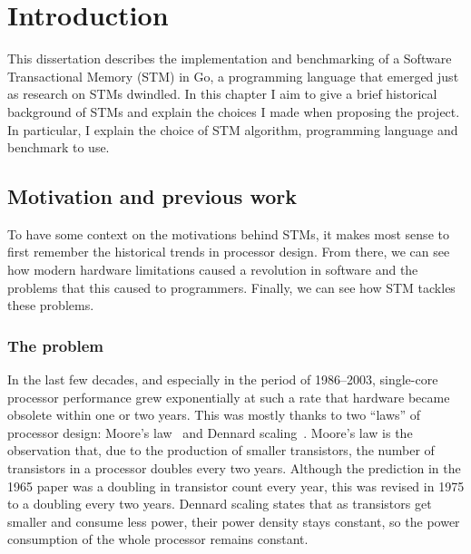 \documentclass[12pt,a4paper,oneside,openright]{report}
\begin{document}
\newpage

\begingroup \let\clearpage\relax \listoffigures{}
 \endgroup


\newpage



\pagestyle{headings}


\chapter{Introduction}


This dissertation describes the implementation and benchmarking of a
Software Transactional Memory (STM) in Go, a programming language that
emerged just as research on STMs dwindled. In this chapter I aim to
give a brief historical background of STMs and explain the choices I
made when proposing the project. In particular, I explain the choice
of STM algorithm, programming language and benchmark to use.

\section{Motivation and previous work}
\label{sec:motivation}

To have some context on the motivations behind STMs, it makes most
sense to first remember the historical trends in processor
design. From there, we can see how modern hardware limitations caused
a revolution in software and the problems that this caused to
programmers. Finally, we can see how STM tackles these problems.

\subsection{The problem}
\label{sec:problem}

In the last few decades, and especially in the period of 1986--2003,
single-core processor performance grew exponentially at such a rate
that hardware became obsolete within one or two years. This was mostly
thanks to two ``laws'' of processor design: Moore's
law~\cite{MooreLaw} and Dennard scaling~\cite{DennardScaling}. Moore's
law is the observation that, due to the production of smaller
transistors, the number of transistors in a processor doubles every
two years. Although the prediction in the 1965 paper was a doubling in
transistor count every year, this was revised in 1975 to a doubling
every two years. Dennard scaling states that as transistors get
smaller and consume less power, their power density stays constant, so
the power consumption of the whole processor remains constant.
\end{document}
